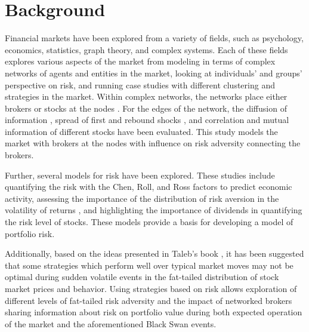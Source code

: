\documentclass[letterpaper, 11 pt, proceedings]{IEEEtran}
\begin{document}
	\section{Background}\label{sec:background}
	Financial markets have been explored from a variety of fields, such as psychology, economics, statistics, graph theory, and complex systems. Each of these fields explores various aspects of the market  from modeling in terms of complex networks of agents and entities in the market, looking at individuals' and groups' perspective on risk, and running case studies with different clustering and strategies in the market. Within complex networks, the networks place either brokers or stocks at the nodes \cite{baydelli_hierarchicalmarket,kulmann_marketscomplexsystems,dimaggio_relevancebrokernetworks,tse_networkstocks}. For the edges of the network, the diffusion of information \cite{dimaggio_relevancebrokernetworks}, spread of first and rebound shocks \cite{gai_contagion}, and correlation and mutual information of different stocks \cite{li_correlation, fiedor_networksmutualinformationrate} have been evaluated. This study models the market with brokers at the nodes with influence on risk adversity connecting the brokers. 
	
	Further, several models for risk have been explored. These studies include quantifying the risk with the Chen, Roll, and Ross factors \cite{cooper_realinvestmentandrisk} to predict economic activity, assessing the importance of the distribution of risk aversion in the volatility of returns \cite{lansing_riskaversion}, and highlighting the importance of dividends in quantifying the risk level of stocks. These models provide a basis for developing a model of portfolio risk.
	
	Additionally, based on the ideas presented in Taleb's book \cite{taleb_antifragile}, it has been suggested that some strategies which perform well over typical market moves may not be optimal during sudden volatile events in the fat-tailed distribution of stock market prices and behavior. Using strategies based on risk allows exploration of different levels of fat-tailed risk adversity and the impact of networked brokers sharing information about risk on portfolio value during both expected operation of the market and the aforementioned Black Swan events.
	
	
\end{document}
